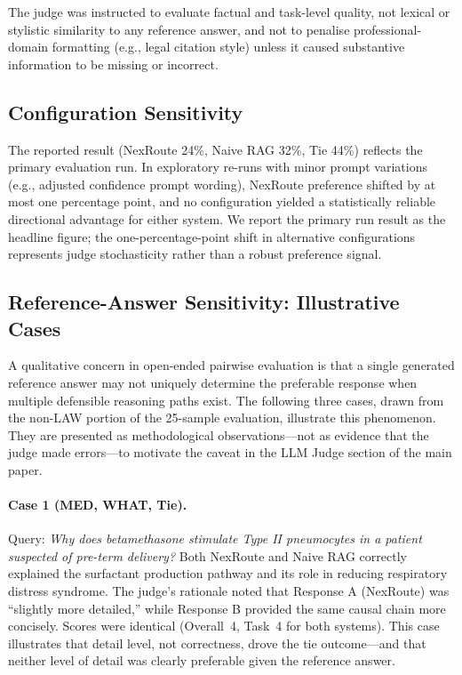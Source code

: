 \documentclass[a4paper,fleql,doubleblind]{cas-sc}
\begin{document}
The judge was instructed to evaluate factual and task-level quality, not
lexical or stylistic similarity to any reference answer, and not to penalise
professional-domain formatting (e.g., legal citation style) unless it caused
substantive information to be missing or incorrect.

\subsection*{Configuration Sensitivity}

The reported result (NexRoute 24\%, Naive RAG 32\%, Tie 44\%) reflects the
primary evaluation run.
In exploratory re-runs with minor prompt variations (e.g., adjusted confidence
prompt wording), NexRoute preference shifted by at most one percentage point,
and no configuration yielded a statistically reliable directional advantage
for either system.
We report the primary run result as the headline figure; the one-percentage-point
shift in alternative configurations represents judge stochasticity rather than
a robust preference signal.

\subsection*{Reference-Answer Sensitivity: Illustrative Cases}

A qualitative concern in open-ended pairwise evaluation is that a single
generated reference answer may not uniquely determine the preferable response
when multiple defensible reasoning paths exist.
The following three cases, drawn from the non-LAW portion of the 25-sample
evaluation, illustrate this phenomenon.
They are presented as methodological observations---not as evidence that the
judge made errors---to motivate the caveat in the LLM Judge section of the main paper.

\paragraph{Case 1 (MED, WHAT, Tie).}
Query: \textit{Why does betamethasone stimulate Type II pneumocytes in a patient
suspected of pre-term delivery?}
Both NexRoute and Naive RAG correctly explained the surfactant production
pathway and its role in reducing respiratory distress syndrome.
The judge's rationale noted that Response A (NexRoute) was ``slightly more
detailed,'' while Response B provided the same causal chain more concisely.
Scores were identical (Overall~4, Task~4 for both systems).
This case illustrates that detail level, not correctness, drove the tie
outcome---and that neither level of detail was clearly preferable given the
reference answer.
\end{document}
